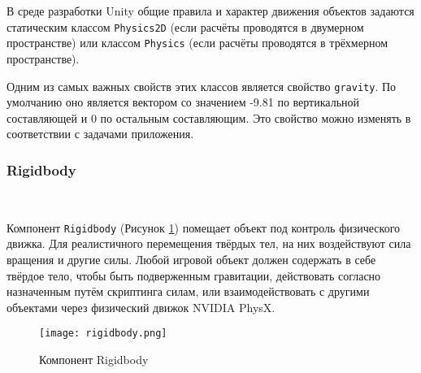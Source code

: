 В среде разработки Unity общие правила и характер движения объектов задаются статическим классом \lstinline{Physics2D} (если расчёты проводятся в двумерном пространстве) или классом \lstinline{Physics} (если расчёты проводятся в трёхмерном пространстве).

Одним из самых важных свойств этих классов является свойство \lstinline{gravity}. По умолчанию оно является вектором со значением -9.81 по вертикальной составляющей и 0 по остальным составляющим. Это свойство можно изменять в соответствии с задачами приложения.

\subsubsection{Rigidbody}~

Компонент \lstinline|Rigidbody| (Рисунок \ref{fig:domain:sec_project:rigidbody}) помещает объект под контроль физического движка. Для реалистичного перемещения твёрдых тел, на них воздействуют сила вращения и другие силы. Любой игровой объект должен содержать в себе твёрдое тело, чтобы быть подверженным гравитации, действовать согласно назначенным путём скриптинга силам, или взаимодействовать с другими объектами через физический движок NVIDIA PhysX.

\begin{figure}[h]
	\noindent\centering
	\texttt{[image: rigidbody.png]}  
	\caption{Компонент Rigidbody}
	\label{fig:domain:sec_project:rigidbody}
\end{figure}

